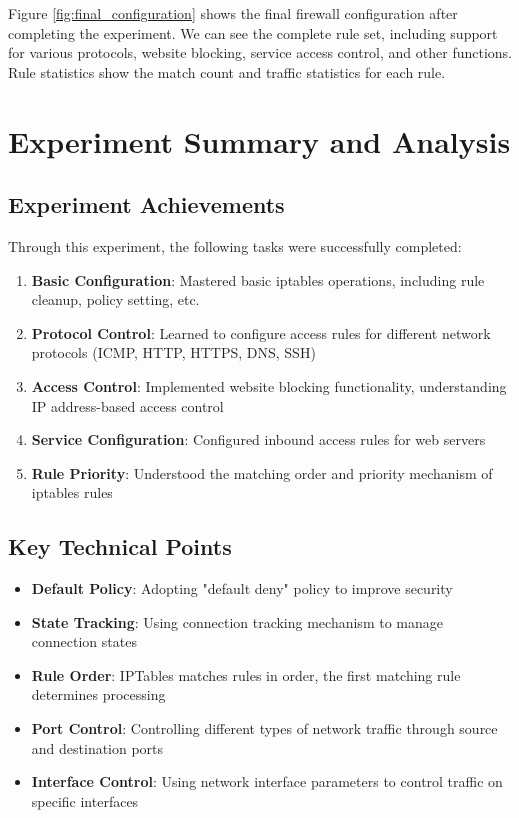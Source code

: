 \documentclass[12pt,a4paper]{article}
\begin{document}
Figure \ref{fig:final_configuration} shows the final firewall configuration after completing the experiment. We can see the complete rule set, including support for various protocols, website blocking, service access control, and other functions. Rule statistics show the match count and traffic statistics for each rule.

\section{Experiment Summary and Analysis}

\subsection{Experiment Achievements}
Through this experiment, the following tasks were successfully completed:
\begin{enumerate}
    \item \textbf{Basic Configuration}: Mastered basic iptables operations, including rule cleanup, policy setting, etc.
    \item \textbf{Protocol Control}: Learned to configure access rules for different network protocols (ICMP, HTTP, HTTPS, DNS, SSH)
    \item \textbf{Access Control}: Implemented website blocking functionality, understanding IP address-based access control
    \item \textbf{Service Configuration}: Configured inbound access rules for web servers
    \item \textbf{Rule Priority}: Understood the matching order and priority mechanism of iptables rules
\end{enumerate}

\subsection{Key Technical Points}
\begin{itemize}
    \item \textbf{Default Policy}: Adopting "default deny" policy to improve security
    \item \textbf{State Tracking}: Using connection tracking mechanism to manage connection states
    \item \textbf{Rule Order}: IPTables matches rules in order, the first matching rule determines processing
    \item \textbf{Port Control}: Controlling different types of network traffic through source and destination ports
    \item \textbf{Interface Control}: Using network interface parameters to control traffic on specific interfaces
\end{itemize}
\end{document}
